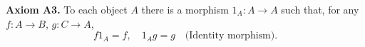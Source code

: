 \textbf{Axiom A3.} To each object $A$ there is a morphism $1_A: A \to A$ such that, for any $f: A \to B$, $g: C \to A$,
$$f 1_A = f, \quad 1_A g = g \quad \text{(Identity morphism)}.$$
